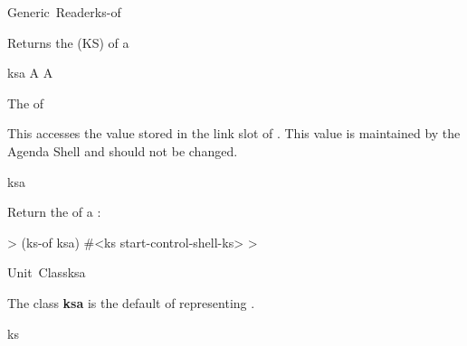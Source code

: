 \documentclass[10pt,twoside,english,pdftex]{article}
\begin{document}
\begin{functiondoc}{Generic~Reader}{ks-of}{ 
    }
%
%
%

\fnsyntax

\fnpurpose Returns the  (KS) 
of a 

\fnmethods
{}

\fnpackage {}

\fnmodule {}

\fnargs
\begin{args}{ksa}
\arg[ksa] A 
\arg[ks] A 
\end{args}

\fnreturns The   of 
  
\fndescription 
This  accesses the value stored in the
 link slot of .  This value is
maintained by the Agenda Shell and should not be changed.

\begin{alsos}{ksa}
\also[ks]
\also[ksa]
\end{alsos}

\fnexample
Return the  of a :
%
\W\supp
\begin{example}
  > (ks-of ksa)
  #<ks start-control-shell-ks>
  >
\end{example}

\end{functiondoc}


\begin{functiondoc}{Unit~Class}{ksa}{}
%
%

\fnsyntax

\fnpackage {}

\fnmodule {}

\fndescription 
The class \textbf{ksa} is the default  of
 representing .

\begin{alsos}{ks}
\also[ks]
\end{alsos}

\end{functiondoc}
\end{document}
